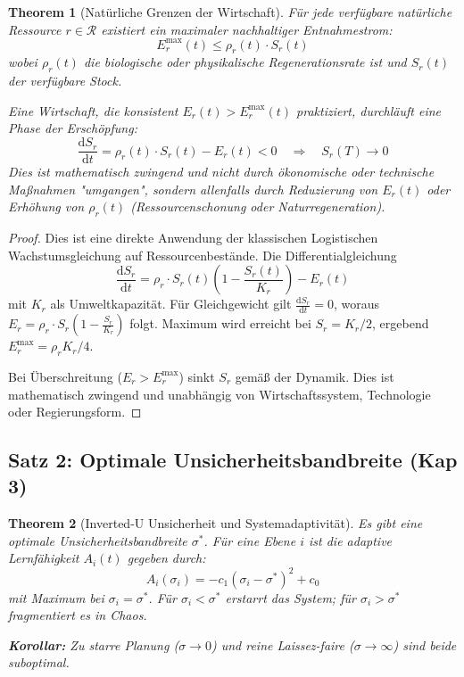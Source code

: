 \documentclass[a4paper, 12pt, twoside, openright]{report}
\newtheorem{theorem}{Theorem}[section]
\theoremstyle{definition}
\theoremstyle{definition}
\begin{document}
\begin{theorem}[Natürliche Grenzen der Wirtschaft]
\label{thm:balance-periodizitaet}
Für jede verfügbare natürliche Ressource $r \in \mathcal{R}$ existiert ein maximaler nachhaltiger Entnahmestrom:
\begin{equation}
E_r^{\max}(t) \leq \rho_r(t) \cdot S_r(t)
\end{equation}
wobei $\rho_r(t)$ die biologische oder physikalische Regenerationsrate ist und $S_r(t)$ der verfügbare Stock.

Eine Wirtschaft, die konsistent $E_r(t) > E_r^{\max}(t)$ praktiziert, durchläuft eine Phase der Erschöpfung:
\begin{equation}
\frac{\mathrm{d}S_r}{\mathrm{d}t} = \rho_r(t) \cdot S_r(t) - E_r(t) < 0 \quad \Rightarrow \quad S_r(T) \to 0
\end{equation}
Dies ist mathematisch zwingend und nicht durch ökonomische oder technische Maßnahmen "umgangen", sondern allenfalls durch Reduzierung von $E_r(t)$ oder Erhöhung von $\rho_r(t)$ (Ressourcenschonung oder Naturregeneration).
\end{theorem}

\begin{proof}
Dies ist eine direkte Anwendung der klassischen Logistischen Wachstumsgleichung auf Ressourcenbestände. Die Differentialgleichung
\begin{equation}
\frac{\mathrm{d}S_r}{\mathrm{d}t} = \rho_r \cdot S_r(t) \left(1 - \frac{S_r(t)}{K_r}\right) - E_r(t)
\end{equation}
mit $K_r$ als Umweltkapazität. Für Gleichgewicht gilt $\frac{\mathrm{d}S_r}{\mathrm{d}t} = 0$, woraus $E_r = \rho_r \cdot S_r(1 - \frac{S_r}{K_r})$ folgt. Maximum wird erreicht bei $S_r = K_r/2$, ergebend $E_r^{\max} = \rho_r K_r / 4$.

Bei Überschreitung ($E_r > E_r^{\max}$) sinkt $S_r$ gemäß der Dynamik. Dies ist mathematisch zwingend und unabhängig von Wirtschaftssystem, Technologie oder Regierungsform.
\end{proof}

\subsection{Satz 2: Optimale Unsicherheitsbandbreite (Kap 3)}

\begin{theorem}[Inverted-U Unsicherheit und Systemadaptivität]
\label{thm:unsicherheit-optimalitaet}
Es gibt eine optimale Unsicherheitsbandbreite $\sigma^*$. Für eine Ebene $i$ ist die adaptive Lernfähigkeit $A_i(t)$ gegeben durch:
\begin{equation}
A_i(\sigma_i) = -c_1(\sigma_i - \sigma^*)^2 + c_0
\end{equation}
mit Maximum bei $\sigma_i = \sigma^*$. Für $\sigma_i < \sigma^*$ erstarrt das System; für $\sigma_i > \sigma^*$ fragmentiert es in Chaos.

\textbf{Korollar:} Zu starre Planung ($\sigma \to 0$) und reine Laissez-faire ($\sigma \to \infty$) sind beide suboptimal.
\end{theorem}
\end{document}
